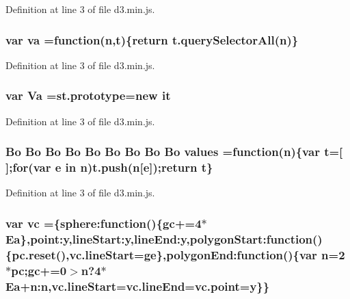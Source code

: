 Definition at line 3 of file d3.\+min.\+js.

\subsubsection[{va}]{\setlength{\rightskip}{0pt plus 5cm}var va =function({\bf n},t)\{{\bf return} t.\+query\+Selector\+All({\bf n})\}}\label{d3_8min_8js_acaf8dacb48d49fdec8dd7d6a498bb152}


Definition at line 3 of file d3.\+min.\+js.

\subsubsection[{Va}]{\setlength{\rightskip}{0pt plus 5cm}var Va ={\bf st.\+prototype}=new it}\label{d3_8min_8js_ac0d5cb42616504f27c35fda718e8345f}


Definition at line 3 of file d3.\+min.\+js.

\subsubsection[{values}]{ {\bf Bo} {\bf Bo} {\bf Bo} {\bf Bo} {\bf Bo} {\bf Bo} {\bf Bo} {\bf Bo} {\bf Bo} values =function({\bf n})\{var t=[$\,$];{\bf for}(var {\bf e} in {\bf n})t.\+push({\bf n}[{\bf e}]);{\bf return} t\}}\label{d3_8min_8js_aa774238cbdae3e03b20861d9b3347976}


Definition at line 3 of file d3.\+min.\+js.

\subsubsection[{vc}]{\setlength{\rightskip}{0pt plus 5cm}var vc =\{sphere\+:function()\{{\bf gc}+=4$\ast${\bf Ea}\},point\+:y,line\+Start\+:y,line\+End\+:y,polygon\+Start\+:function()\{pc.\+reset(),vc.\+line\+Start=ge\},polygon\+End\+:function()\{var {\bf n}=2$\ast${\bf pc};{\bf gc}+=0$>${\bf n}?4$\ast${\bf Ea}+n\+:n,vc.\+line\+Start=vc.\+line\+End=vc.\+point=y\}\}}\label{d3_8min_8js_a3e6a48a65b4875d2bcd3007321eaa32f}


